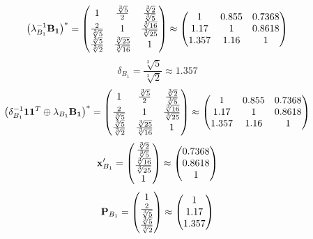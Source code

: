 \documentclass[10pt,a4paper]{article}
\begin{document}
	\[
		\left(\lambda_{B_1}^{-1}\bold{B_1}\right)^* = 
		\begin{pmatrix}
			{1} {} & \frac{\sqrt[3]{5}} {{2}} & \frac{\sqrt[3]{2}} {\sqrt[3]{5}} \\
			\frac{{2}} {\sqrt[3]{5}} & {1} {} & \frac{\sqrt[3]{16}} {\sqrt[3]{25}} \\
			\frac{\sqrt[3]{5}} {\sqrt[3]{2}} & \frac{\sqrt[3]{25}} {\sqrt[3]{16}} & {1} {} \\
		\end{pmatrix}
		\approx
		\begin{pmatrix}
			1        & 0.855    & 0.7368   \\
			1.17     & 1        & 0.8618   \\
			1.357    & 1.16     & 1        \\
		\end{pmatrix}
	\]
	\[
		\delta_{B_1} = \frac{\sqrt[3]{5}} {\sqrt[3]{2}}\approx 1.357
	\]
	\[
		\left(\delta_{B_1}^{-1}\bold{11}^T \oplus \lambda_{B_1}\bold{B_1}\right)^* = 
		\begin{pmatrix}
			{1} {} & \frac{\sqrt[3]{5}} {{2}} & \frac{\sqrt[3]{2}} {\sqrt[3]{5}} \\
			\frac{{2}} {\sqrt[3]{5}} & {1} {} & \frac{\sqrt[3]{16}} {\sqrt[3]{25}} \\
			\frac{\sqrt[3]{5}} {\sqrt[3]{2}} & \frac{\sqrt[3]{25}} {\sqrt[3]{16}} & {1} {} \\
		\end{pmatrix}
		\approx
		\begin{pmatrix}
			1        & 0.855    & 0.7368   \\
			1.17     & 1        & 0.8618   \\
			1.357    & 1.16     & 1        \\
		\end{pmatrix}
	\]
	\[
		\bold{x}'_{B_1} = 
		\begin{pmatrix}
			\frac{\sqrt[3]{2}} {\sqrt[3]{5}} \\
			\frac{\sqrt[3]{16}} {\sqrt[3]{25}} \\
			{1} {} \\
		\end{pmatrix}
		\approx
		\begin{pmatrix}
			0.7368   \\
			0.8618   \\
			1        \\
		\end{pmatrix}
	\]
	\[
		\bold{P}_{B_1} = 
		\begin{pmatrix}
			{1} {} \\
			\frac{{2}} {\sqrt[3]{5}} \\
			\frac{\sqrt[3]{5}} {\sqrt[3]{2}} \\
		\end{pmatrix}
		\approx
		\begin{pmatrix}
			1        \\
			1.17     \\
			1.357    \\
		\end{pmatrix}
	\]
\end{document}
